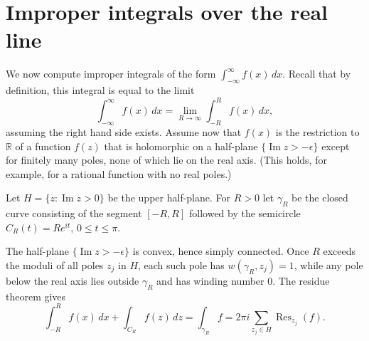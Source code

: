 \documentclass[11pt]{article}
\theoremstyle{plain}
\theoremstyle{definition}
\theoremstyle{remark}
\numberwithin{equation}{section}
\newcommand{\R}{\mathbb{R}}
\DeclareMathOperator{\Imag}{Im}
\newenvironment{lecturefigure}
 {\par\addvspace{0.25em}\begingroup\setlength{\parskip}{0pt}\centering}
 {\par\endgroup\addvspace{0.25em}}
\begin{document}
\section{Improper integrals over the real line}
We now compute improper integrals of the form
$\int_{-\infty}^{\infty}f(x)\,dx$. Recall that by definition, this integral is equal to the limit
\[
 \int_{-\infty}^{\infty}f(x)\,dx=\lim_{R\to\infty}\int_{-R}^{R}f(x)\,dx,
\] assuming the right hand side exists.
Assume now that $f(x)$ is the restriction to $\R$ of a function $f(z)$ that is
holomorphic on a half-plane $\{\Imag z>-\epsilon\}$ except for finitely
many poles, none of which lie on the real axis. (This holds, for
example, for a rational function with no real poles.)

Let $H=\{z:\Imag z>0\}$ be the upper half-plane. For $R>0$ let $\gamma_R$
be the closed curve consisting of the segment $[-R,R]$ followed by the
semicircle $C_R(t)=Re^{it}$, $0\leq t\leq\pi$.

\begin{lecturefigure}
\end{lecturefigure}

The half-plane $\{\Imag z>-\epsilon\}$ is convex, hence simply connected.
Once $R$ exceeds the moduli of all poles $z_j$ in $H$, each such pole has
$w(\gamma_R,z_j)=1$, while any pole below the real axis lies outside
$\gamma_R$ and has winding number $0$. The residue theorem gives
\[
 \int_{-R}^{R}f(x)\,dx+\int_{C_R}f(z)\,dz
 =\int_{\gamma_R}f
 =2\pi i\sum_{z_j\in H}\operatorname{Res}_{z_j}(f).
\]
\end{document}

